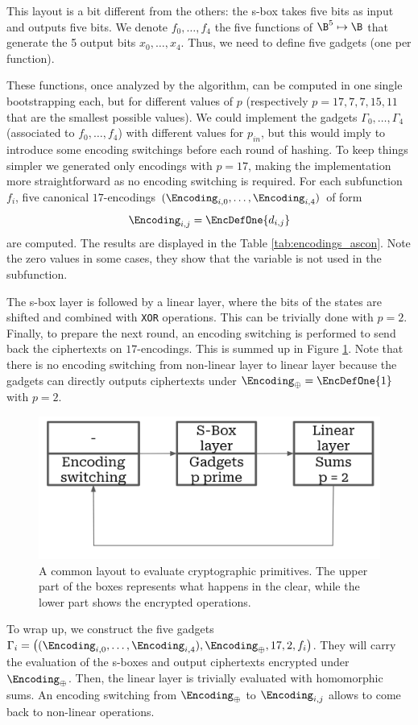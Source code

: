 This layout is a bit different from the others: the s-box takes five bits as input and outputs five bits. We denote $f_0, \dots, f_4$ the five functions of $\B^5 \mapsto \B$ that generate the 5 output bits $x_0, \dots, x_4$. Thus, we need to define five gadgets (one per function).

These functions, once analyzed by the algorithm, can be computed in one single bootstrapping each, but for different values of $p$ (respectively $p=17, 7, 7, 15, 11$ that are the smallest possible values). We could implement the gadgets $\Gamma_0, \dots, \Gamma_4$ (associated to $f_0, \dots, f_4$) with different values for $p_{in}$, but this would imply to introduce some encoding switchings before each round of hashing. To keep things simpler we generated only encodings with $p = 17$, making the implementation more straightforward as no encoding switching is required. For each subfunction $f_i$, five canonical $17$-encodings $(\Encoding_{i, 0}, \dots, \Encoding_{i, 4})$ of form $$\Encoding_{i, j} = \EncDefOne{d_{i,j}}$$ are computed. The results are displayed in the Table \ref{tab:encodings_ascon}. Note the zero values in some cases, they show that the variable is not used in the subfunction. 

The s-box layer is followed by a linear layer, where the bits of the states are shifted and combined with \texttt{XOR} operations. This can be trivially done with $p=2$. Finally, to prepare the next round, an encoding switching is performed to send back the ciphertexts on $17$-encodings. This is summed up in Figure \ref{fig:layout_spn}. Note that there is no encoding switching from non-linear layer to linear layer because the gadgets can directly outputs ciphertexts under $\Encoding_\oplus = \EncDefOne{1}$ with $p=2$.

\begin{figure}
    \centering
    \includegraphics[width=0.5\linewidth]{images/layout_spn.png}
    \caption{A common layout to evaluate cryptographic primitives. The upper part of the boxes represents what happens in the clear, while the lower part shows the encrypted operations. }
    \label{fig:layout_spn}
\end{figure}


To wrap up, we construct the five gadgets $\Gamma_i = \left ( (\Encoding_{i,0}, \dots,  \Encoding_{i, 4}), \Encoding_\oplus, 17, 2, f_i \right )$. They will carry the evaluation of the s-boxes and output ciphertexts encrypted under $\Encoding_\oplus$. Then, the linear layer is trivially evaluated with homomorphic sums. An encoding switching from $\Encoding_\oplus$ to $\Encoding_{i, j}$ allows to come back to non-linear operations.




